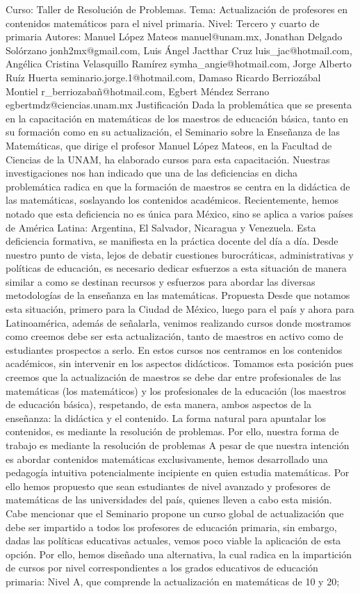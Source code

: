           \noindent Curso: Taller de Resolución de Problemas. Tema: Actualización de profesores en contenidos matemáticos para el nivel primaria. Nivel: Tercero y cuarto de primaria Autores: Manuel López Mateos manuel@unam.mx, Jonathan Delgado Solórzano jonh2mx@gmail.com, Luis Ángel Jactthar Cruz luis_jac@hotmail.com, Angélica Cristina Velasquillo Ramírez symha_angie@hotmail.com, Jorge Alberto Ruíz Huerta seminario.jorge.1@hotmail.com, Damaso Ricardo Berriozábal Montiel r_berriozabañ@hotmail.com, Egbert Méndez Serrano egbertmdz@ciencias.unam.mx Justificación Dada la problemática que se presenta en la capacitación en matemáticas de los maestros de educación básica, tanto en su formación como en su actualización, el Seminario sobre la Enseñanza de las Matemáticas, que dirige el profesor Manuel López Mateos, en la Facultad de Ciencias de la UNAM, ha elaborado cursos para esta capacitación. Nuestras investigaciones nos han indicado que una de las deficiencias en dicha problemática radica en que la formación de maestros se centra en la didáctica de las matemáticas, soslayando los contenidos académicos. Recientemente, hemos notado que esta deficiencia no es única para México, sino se aplica a varios países de América Latina: Argentina, El Salvador, Nicaragua y Venezuela. Esta deficiencia formativa, se manifiesta en la práctica docente del día a día. Desde nuestro punto de vista, lejos de debatir cuestiones burocráticas, administrativas y políticas de educación, es necesario dedicar esfuerzos a esta situación de manera similar a como se destinan recursos y esfuerzos para abordar las diversas metodologías de la enseñanza en las matemáticas. Propuesta Desde que notamos esta situación, primero para la Ciudad de México, luego para el país y ahora para Latinoamérica, además de señalarla, venimos realizando cursos donde mostramos como creemos debe ser esta actualización, tanto de maestros en activo como de estudiantes prospectos a serlo. En estos cursos nos centramos en los contenidos académicos, sin intervenir en los aspectos didácticos. Tomamos esta posición pues creemos que la actualización de maestros se debe dar entre profesionales de las matemáticas (los matemáticos) y los profesionales de la educación (los maestros de educación básica), respetando, de esta manera, ambos aspectos de la enseñanza: la didáctica y el contenido. La forma natural para apuntalar los contenidos, es mediante la resolución de problemas. Por ello, nuestra forma de trabajo es mediante la resolución de problemas A pesar de que nuestra intención es abordar contenidos matemáticas exclusivamente, hemos desarrollado una pedagogía intuitiva potencialmente incipiente en quien estudia matemáticas. Por ello hemos propuesto que sean estudiantes de nivel avanzado y profesores de matemáticas de las universidades del país, quienes lleven a cabo esta misión. Cabe mencionar que el Seminario propone un curso global de actualización que debe ser impartido a todos los profesores de educación primaria, sin embargo, dadas las políticas educativas actuales, vemos poco viable la aplicación de esta opción. Por ello, hemos diseñado una alternativa, la cual radica en la impartición de cursos por nivel correspondientes a los grados educativos de educación primaria: Nivel A, que comprende la actualización en matemáticas de 10 y 20; 